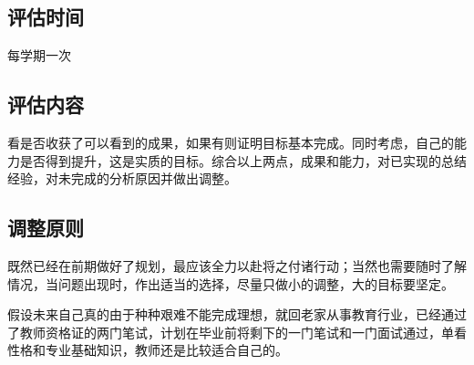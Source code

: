 \documentclass{article}
\begin{document}
\subsection{评估时间}
每学期一次\par
\subsection{评估内容}
看是否收获了可以看到的成果，如果有则证明目标基本完成。同时考虑，自己的能力是否得到提升，这是实质的目标。综合以上两点，成果和能力，对已实现的总结经验，对未完成的分析原因并做出调整。\par
\subsection{调整原则}
既然已经在前期做好了规划，最应该全力以赴将之付诸行动；当然也需要随时了解情况，当问题出现时，作出适当的选择，尽量只做小的调整，大的目标要坚定。\par
假设未来自己真的由于种种艰难不能完成理想，就回老家从事教育行业，已经通过了教师资格证的两门笔试，计划在毕业前将剩下的一门笔试和一门面试通过，单看性格和专业基础知识，教师还是比较适合自己的。
\par
\end{document}
